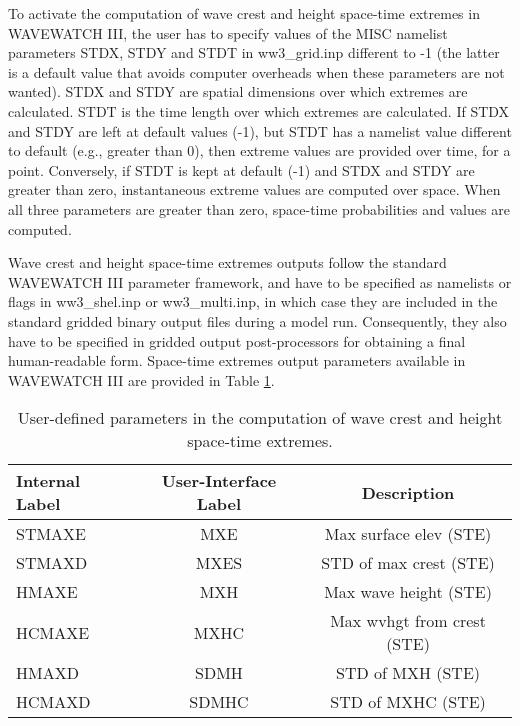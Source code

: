 To activate the computation of wave crest and height space-time extremes in WAVEWATCH III, the user has to specify values of the {\F MISC} namelist parameters {\code STDX}, {\code STDY} and {\code STDT} in {\file ww3\_grid.inp} different to -1 (the latter is a default value that avoids computer overheads when these parameters are not wanted). {\code STDX} and {\code STDY} are spatial dimensions over which extremes are calculated. {\code STDT} is the time length over which extremes are calculated. If {\code STDX} and {\code STDY} are left at default values (-1), but {\code STDT} has a namelist value different to default (e.g., greater than 0), then extreme values are provided over time, for a point. Conversely, if {\code STDT} is kept at default (-1) and {\code STDX} and {\code STDY} are greater than zero, instantaneous extreme values are computed over space. When all three parameters are greater than zero, space-time probabilities and values are computed.

Wave crest and height space-time extremes outputs follow the standard WAVEWATCH III parameter framework, and have to be specified as namelists or flags in {\file ww3\_shel.inp} or {\file ww3\_multi.inp}, in which case they are included in the standard gridded binary output files during a model run. Consequently, they also have to be specified in gridded output post-processors for obtaining a final human-readable form. Space-time extremes output parameters available in WAVEWATCH III are provided in Table \ref{tab:ste_parm}.

\begin{table}[h]
\begin{center} \begin{tabular}{|l|c|c|} \hline \hline
Internal Label & User-Interface Label & Description \\ \hline
STMAXE  &   MXE   & Max surface elev (STE) \\
STMAXD  &   MXES  & STD of max crest (STE) \\
HMAXE   &   MXH   & Max wave height (STE) \\
HCMAXE  &   MXHC  & Max wvhgt from crest (STE) \\
HMAXD   &   SDMH  & STD of MXH (STE) \\
HCMAXD  &   SDMHC & STD of MXHC (STE) \\ \hline
\end{tabular}
\end{center}
\caption{User-defined parameters in the computation of wave crest and height space-time extremes.}
\label{tab:ste_parm} \botline \end{table}


